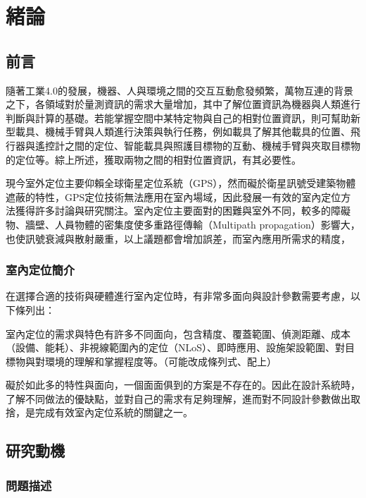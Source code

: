 \chapter{緒論}


\section{前言} %

隨著工業4.0的發展，機器、人與環境之間的交互互動愈發頻繁，萬物互連的背景之下，各領域對於量測資訊的需求大量增加，其中了解位置資訊為機器與人類進行判斷與計算的基礎。若能掌握空間中某特定物與自己的相對位置資訊，則可幫助新型載具、機械手臂與人類進行決策與執行任務，例如載具了解其他載具的位置、飛行器與遙控計之間的定位、智能載具與照護目標物的互動、機械手臂與夾取目標物的定位等。綜上所述，獲取兩物之間的相對位置資訊，有其必要性。

現今室外定位主要仰賴全球衛星定位系統（GPS），然而礙於衛星訊號受建築物體遮蔽的特性，GPS定位技術無法應用在室內場域，因此發展一有效的室內定位方法獲得許多討論與研究關注。室內定位主要面對的困難與室外不同，較多的障礙物、牆壁、人員物體的密集度使多重路徑傳輸（Multipath propagation）影響大，也使訊號衰減與散射嚴重，以上議題都會增加誤差，而室內應用所需求的精度，


\subsection{室內定位簡介}


在選擇合適的技術與硬體進行室內定位時，有非常多面向與設計參數需要考慮，以下條列出：

室內定位的需求與特色有許多不同面向，包含精度、覆蓋範圍、偵測距離、成本（設備、能耗）、非視線範圍內的定位（NLoS）、即時應用、設施架設範圍、對目標物與對環境的理解和掌握程度等。（可能改成條列式、配上）

礙於如此多的特性與面向，一個面面俱到的方案是不存在的。因此在設計系統時，了解不同做法的優缺點，並對自己的需求有足夠理解，進而對不同設計參數做出取捨，是完成有效室內定位系統的關鍵之一。


\section{研究動機}
\subsection{問題描述}

